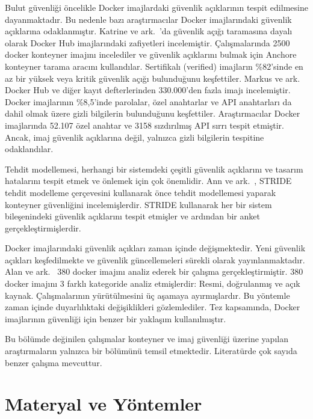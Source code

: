 Bulut güvenliği öncelikle Docker imajlardaki güvenlik açıklarının tespit edilmesine dayanmaktadır. Bu nedenle bazı araştırmacılar Docker imajlarındaki güvenlik açıklarına odaklanmıştır. Katrine ve ark.~\autocite{VulnerabilityAnalysisof2500DockerHubImages}'da güvenlik açığı taramasına dayalı olarak Docker Hub imajlarındaki zafiyetleri incelemiştir. Çalışmalarında 2500 docker konteyner imajını incelediler ve güvenlik açıklarını bulmak için Anchore konteyner tarama aracını kullandılar. Sertifikalı (verified) imajların \%82'sinde en az bir yüksek veya kritik güvenlik açığı bulunduğunu keşfettiler. Markus ve ark.~\autocite{Dahlmanns_2023} Docker Hub ve diğer kayıt defterlerinden 330.000'den fazla imajı incelemiştir. Docker imajlarının \%8,5'inde parolalar, özel anahtarlar ve API anahtarları da dahil olmak üzere gizli bilgilerin bulunduğunu keşfettiler. Araştırmacılar Docker imajlarında 52.107 özel anahtar ve 3158 sızdırılmış API sırrı tespit etmiştir. Ancak, imaj güvenlik açıklarına değil, yalnızca gizli bilgilerin tespitine odaklandılar.

Tehdit modellemesi, herhangi bir sistemdeki çeşitli güvenlik açıklarını ve tasarım hatalarını tespit etmek ve önlemek için çok önemlidir. Ann ve ark.~\autocite{WONG2023103140}, STRIDE tehdit modelleme çerçevesini kullanarak önce tehdit modellemesi yaparak konteyner güvenliğini incelemişlerdir. STRIDE kullanarak her bir sistem bileşenindeki güvenlik açıklarını tespit etmişler ve ardından bir anket gerçekleştirmişlerdir.

Docker imajlarındaki güvenlik açıkları zaman içinde değişmektedir. Yeni güvenlik açıkları keşfedilmekte ve güvenlik güncellemeleri sürekli olarak yayınlanmaktadır. Alan ve ark.~\autocite{Mills2023} 380 docker imajını analiz ederek bir çalışma gerçekleştirmiştir. 380 docker imajını 3 farklı kategoride analiz etmişlerdir: Resmi, doğrulanmış ve açık kaynak. Çalışmalarının yürütülmesini üç aşamaya ayırmışlardır. Bu yöntemle zaman içinde duyarlılıktaki değişiklikleri gözlemlediler. Tez kapsamında, Docker imajlarının güvenliği için benzer bir yaklaşım kullanılmıştır.

Bu bölümde değinilen çalışmalar konteyner ve imaj güvenliği üzerine yapılan  araştırmaların yalnızca bir bölümünü temsil etmektedir. Literatürde çok sayıda benzer çalışma mevcuttur.

\chapter{Materyal ve Yöntemler}\label{ch:methodology}

